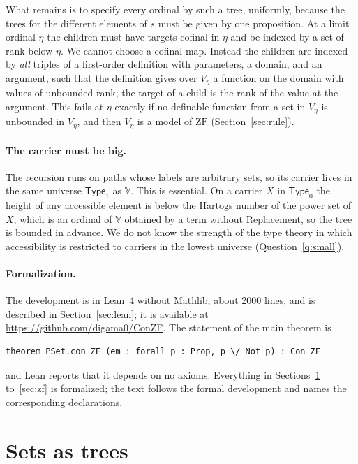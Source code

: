 \documentclass[10pt]{article}
\theoremstyle{definition}
\theoremstyle{remark}
\newcommand{\Type}{\mathsf{Type}}
\newcommand{\ZF}{\mathrm{ZF}}
\newcommand{\V}{\mathbb{V}}
\begin{document}
What remains is to specify every ordinal by such a tree, uniformly,
because the trees for the different elements of $s$ must be given by
one proposition. At a limit ordinal $\eta$ the children must have targets
cofinal in $\eta$ and be indexed by a set of rank below $\eta$. We cannot
choose a cofinal map. Instead the children are indexed by \emph{all}
triples of a first-order definition with parameters, a domain, and an
argument, such that the definition gives over $V_\eta$ a function on the
domain with values of unbounded rank; the target of a child is the rank
of the value at the argument. This fails at $\eta$ exactly if no definable
function from a set in $V_\eta$ is unbounded in $V_\eta$, and then $V_\eta$ is a
model of $\ZF$ (Section~\ref{sec:rule}).

\paragraph{The carrier must be big.}
The recursion runs on paths whose labels are arbitrary sets, so its
carrier lives in the same universe $\Type_1$ as $\V$. This is essential.
On a carrier $X$ in $\Type_0$ the height of any accessible element is
below the Hartogs number of the power set of $X$, which is an ordinal of
$\V$ obtained by a term without Replacement, so the tree is bounded in
advance.
We do not know the strength of the type theory in which accessibility is
restricted to carriers in the lowest universe
(Question~\ref{q:small}).

\paragraph{Formalization.}
The development is in Lean~4 without Mathlib, about 2000 lines, and
is described in Section~\ref{sec:lean}; it is available at
\url{https://github.com/digama0/ConZF}. The statement of the main
theorem is
\begin{verbatim}
theorem PSet.con_ZF (em : forall p : Prop, p \/ Not p) : Con ZF
\end{verbatim}
and Lean reports that it depends on no axioms. Everything in
Sections~\ref{sec:sets} to~\ref{sec:zf} is formalized; the text follows
the formal development and names the corresponding declarations.

\section{Sets as trees}\label{sec:sets}
\end{document}
